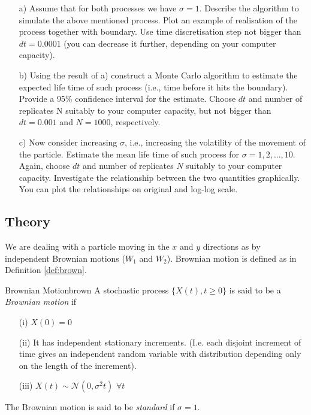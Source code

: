 \begin{itemize}
    \item[a)] Assume that for both processes we have $\sigma = 1$. Describe the algorithm to simulate the above
mentioned process. Plot an example of realisation of the process together with boundary. Use time
discretisation step not bigger than $dt = 0.0001$ (you can decrease it further, depending on your
computer capacity).
    \item[b)] Using the result of a) construct a Monte Carlo algorithm to estimate the expected life time of such
process (i.e., time before it hits the boundary). Provide a 95\% confidence interval for the estimate.
Choose $dt$ and number of replicates N suitably to your computer capacity, but not bigger than
$dt = 0.001$ and $N = 1000$, respectively.
    \item[c)] Now consider increasing $\sigma$, i.e., increasing the volatility of the movement of the particle. Estimate the
mean life time of such process for $\sigma = 1, 2, . . . , 10$. Again, choose $dt$ and number of replicates $N$ suitably to your computer capacity. Investigate the relationship between the two quantities graphically.
You can plot the relationships on original and log-log scale.
\end{itemize}

\subsection{Theory}
\label{sec:theory2}


We are dealing with a particle moving in the $x$ and $y$ directions as by independent Brownian motions ($W_1$ and $W_2$). Brownian motion is defined as in Definition \ref{def:brown}.

\begin{definition}{Brownian Motion}{brown}
A stochastic process $\{ X(t), t \geq 0 \}$ is said to be a \textit{Brownian motion} if
\begin{enumerate}
    \item [(i)] $X(0) = 0$
    \item [(ii)] It has independent stationary increments. (I.e. each disjoint increment of time gives an independent random variable with distribution depending only on the length of the increment). 
    \item [(iii)] $X(t) \sim \mathcal{N}(0, \sigma ^ 2 t)$ $\forall t$ 
\end{enumerate}
The Brownian motion is said to be \textit{standard} if $\sigma = 1$.
\end{definition}

